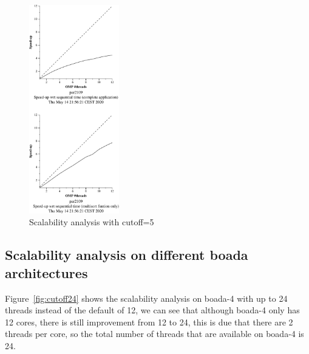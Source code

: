 \begin{figure}[H]
        \centering
        \includegraphics[width=0.35\textwidth]{plots/new-omp-tree-cutoff-5-crop.pdf}
        \caption{Scalability analysis with cutoff=5}
        \label{fig:cutoff5} 
\end{figure}

\subsection{Scalability analysis on different boada architectures}

Figure~\ref{fig:cutoff24} shows the scalability analysis on boada-4 with up to 24 threads instead of the
default of 12, we can see that although boada-4 only has 12 cores, there is still improvement from 12 to 24,
this is due that there are 2 threads per core, so the total number of threads that are available on boada-4
is 24.

